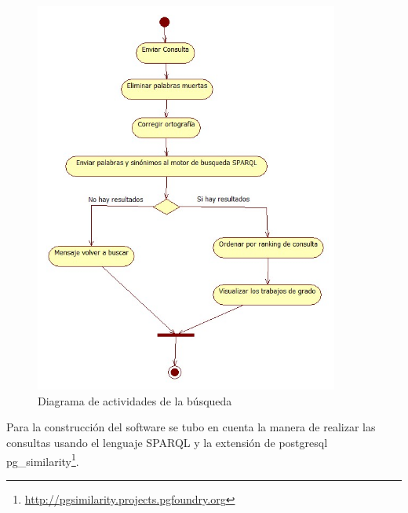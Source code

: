 \begin{figure}[!ht]
\begin{center}
\includegraphics[width=10cm]{pictures/prueba1.jpg}
\end{center}
\caption{Diagrama de actividades de la búsqueda} \label{figura:prueba1}
\end{figure}


Para la construcción del software se tubo en cuenta la manera de 
realizar las consultas usando el lenguaje SPARQL y la extensión de 
postgresql pg\_similarity\footnote{\url{http://pgsimilarity.projects.pgfoundry.org}}.